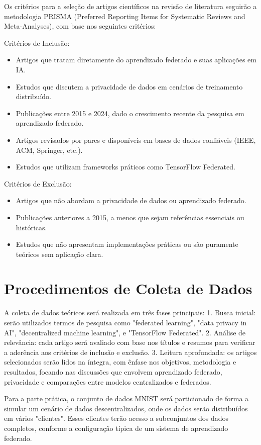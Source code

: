 Os critérios para a seleção de artigos científicos na revisão de literatura seguirão a metodologia PRISMA (Preferred Reporting Items for Systematic Reviews and Meta-Analyses), com base nos seguintes critérios:

Critérios de Inclusão:
\begin{itemize}
    \item Artigos que tratam diretamente do aprendizado federado e suas aplicações em IA.
    \item Estudos que discutem a privacidade de dados em cenários de treinamento distribuído.
    \item Publicações entre 2015 e 2024, dado o crescimento recente da pesquisa em aprendizado federado.
    \item Artigos revisados por pares e disponíveis em bases de dados confiáveis (IEEE, ACM, Springer, etc.).
    \item Estudos que utilizam frameworks práticos como TensorFlow Federated.
\end{itemize}

Critérios de Exclusão:
\begin{itemize}
    \item Artigos que não abordam a privacidade de dados ou aprendizado federado.
    \item Publicações anteriores a 2015, a menos que sejam referências essenciais ou históricas.
    \item Estudos que não apresentam implementações práticas ou são puramente teóricos sem aplicação clara.
\end{itemize}

\section{Procedimentos de Coleta de Dados}

A coleta de dados teóricos será realizada em três fases principais:
1. Busca inicial: serão utilizados termos de pesquisa como "federated learning", "data privacy in AI", "decentralized machine learning", e "TensorFlow Federated".
2. Análise de relevância: cada artigo será avaliado com base nos títulos e resumos para verificar a aderência aos critérios de inclusão e exclusão.
3. Leitura aprofundada: os artigos selecionados serão lidos na íntegra, com ênfase nos objetivos, metodologia e resultados, focando nas discussões que envolvem aprendizado federado, privacidade e comparações entre modelos centralizados e federados.

Para a parte prática, o conjunto de dados MNIST será particionado de forma a simular um cenário de dados descentralizados, onde os dados serão distribuídos em vários "clientes". Esses clientes terão acesso a subconjuntos dos dados completos, conforme a configuração típica de um sistema de aprendizado federado.

